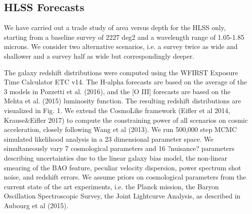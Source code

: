    
\subsection{HLSS Forecasts}
We have carried out a trade study of area versus depth for the HLSS only, starting from a baseline survey of 2227 deg2 and a wavelength range of 1.05-1.85 microns. We consider two alternative scenarios, i.e. a survey twice as wide and shallower and a survey half as wide but correspondingly deeper.  

The galaxy redshift distributions were computed using the WFIRST Exposure Time Calculator ETC v14. The H-alpha forecasts are based on the average of the 3 models in Pozzetti et al. (2016), and the [O III] forecasts are based on the Mehta et al. (2015) luminosity function. The resulting redshift distributions are visualized in Fig. 1.
We extend the CosmoLike framework (Eifler et al 2014, Krause\&Eifler 2017) to compute the constraining power of all scenarios on cosmic acceleration, closely following Wang et al (2013). We run 500,000 step MCMC simulated likelihood analysis in a 23 dimensional parameter space. We simultaneously vary 7 cosmological parameters and 16 ?nuisance? parameters describing uncertainties due to the linear galaxy bias model, the non-linear smearing of the BAO feature, peculiar velocity dispersion, power spectrum shot noise, and redshift errors. We assume priors on cosmological parameters from the current state of the art experiments, i.e. the Planck mission, the Baryon Oscillation Spectroscopic Survey, the Joint Lightcurve Analysis, as described in Aubourg et al (2015). 

